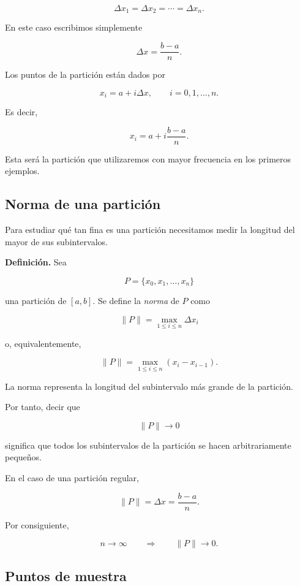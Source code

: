 \documentclass[12pt]{article}
\begin{document}
\[
\Delta x_1=\Delta x_2=\cdots=\Delta x_n.
\]

En este caso escribimos simplemente

\[
\Delta x=\frac{b-a}{n}.
\]

Los puntos de la partición están dados por

\[
x_i=a+i\Delta x,
\qquad i=0,1,\ldots,n.
\]

Es decir,

\[
x_i
=
a+i\frac{b-a}{n}.
\]

Esta será la partición que utilizaremos con mayor frecuencia en los
primeros ejemplos.

\subsection{Norma de una partición}

Para estudiar qué tan fina es una partición necesitamos medir la longitud
del mayor de sus subintervalos.

\textbf{Definición.}
Sea

\[
P=\{x_0,x_1,\ldots,x_n\}
\]

una partición de $[a,b]$. Se define la \emph{norma} de $P$ como

\[
\boxed{
\|P\|
=
\max_{1\leq i\leq n}
\Delta x_i
}
\]

o, equivalentemente,

\[
\|P\|
=
\max_{1\leq i\leq n}
(x_i-x_{i-1}).
\]

La norma representa la longitud del subintervalo más grande de la
partición.

Por tanto, decir que

\[
\|P\|\longrightarrow0
\]

significa que todos los subintervalos de la partición se hacen
arbitrariamente pequeños.

En el caso de una partición regular,

\[
\|P\|=\Delta x=\frac{b-a}{n}.
\]

Por consiguiente,

\[
n\longrightarrow\infty
\qquad\Longrightarrow\qquad
\|P\|\longrightarrow0.
\]

\subsection{Puntos de muestra}
\end{document}
